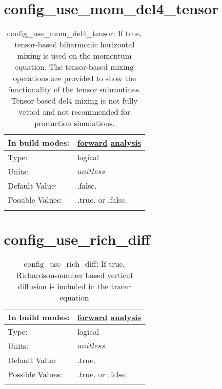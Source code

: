 \section[config\_use\_mom\_del4\_tensor]{config\_use\_mom\_del4\_tensor}
\label{sec:nm_sec_config_use_mom_del4_tensor}
\begin{center}
\begin{longtable}{| p{2.0in} || p{4.0in} |}
    \hline
    In build modes: & \hyperref[subsec:forward_nm_tab_hmix_del4_tensor]{forward} \hyperref[subsec:analysis_nm_tab_hmix_del4_tensor]{analysis} \\
    \hline
    Type: & logical \\
    \hline
    Units: & $unitless$ \\
    \hline
    Default Value: & .false. \\
    \hline
    Possible Values: & .true. or .false. \\
    \hline
    \caption{config\_use\_mom\_del4\_tensor: If true, tensor-based biharmonic horizontal mixing is used on the momentum equation.  The tensor-based mixing operations are provided to show the functionality of the tensor subroutines.  Tensor-based del4 mixing is not fully vetted and not recommended for production simulations.}
\end{longtable}
\end{center}
\section[config\_use\_rich\_diff]{config\_use\_rich\_diff}
\label{sec:nm_sec_config_use_rich_diff}
\begin{center}
\begin{longtable}{| p{2.0in} || p{4.0in} |}
    \hline
    In build modes: & \hyperref[subsec:forward_nm_tab_vmix_rich]{forward} \hyperref[subsec:analysis_nm_tab_vmix_rich]{analysis} \\
    \hline
    Type: & logical \\
    \hline
    Units: & $unitless$ \\
    \hline
    Default Value: & .true. \\
    \hline
    Possible Values: & .true. or .false. \\
    \hline
    \caption{config\_use\_rich\_diff: If true, Richardson-number based vertical diffusion is included in the tracer equation}
\end{longtable}
\end{center}

